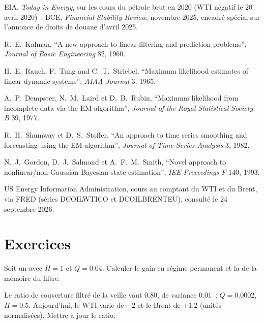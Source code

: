 \begin{omsources}
\item EIA, \emph{Today in Energy}, sur les cours du pétrole brut en 2020 (WTI négatif le 20 avril 2020)~; BCE, \emph{Financial Stability Review}, novembre 2025, encadré spécial sur l'annonce de droits de douane d'avril 2025.
\item R.~E.~Kalman, ``A new approach to linear filtering and prediction problems'', \emph{Journal of Basic Engineering} 82, 1960.
\item H.~E.~Rauch, F.~Tung and C.~T.~Striebel, ``Maximum likelihood estimates of linear dynamic systems'', \emph{AIAA Journal} 3, 1965.
\item A.~P.~Dempster, N.~M.~Laird et D.~B.~Rubin, ``Maximum likelihood from incomplete data via the EM algorithm'', \emph{Journal of the Royal
Statistical Society B} 39, 1977.
\item R.~H.~Shumway et D.~S.~Stoffer, ``An approach to time series smoothing and forecasting using the EM algorithm'', \emph{Journal of Time Series
Analysis} 3, 1982.
\item N.~J.~Gordon, D.~J.~Salmond et A.~F.~M.~Smith, ``Novel approach to nonlinear/non-Gaussian Bayesian state estimation'', \emph{IEE Proceedings F} 140,
1993.
\item US Energy Information Administration, cours au comptant du WTI et du Brent, via FRED (séries DCOILWTICO et DCOILBRENTEU), consulté le 24 septembre 2026.
\end{omsources}

\section{Exercices}

\begin{exercise}[$\star$]\label{exo:qm:state-space-models-and-the-kalman-filter:1}
Soit un  avec $H = 1$ et $Q = 0.04$. Calculer le gain en régime permanent et la  de la mémoire du filtre.
\end{exercise}

\begin{exercise}[$\star$]\label{exo:qm:state-space-models-and-the-kalman-filter:2}
Le ratio de couverture filtré de la veille vaut $0.80$, de variance $0.01$~; $Q = 0.0002$, $H = 0.5$. Aujourd'hui, le WTI varie de $+2$ et le Brent de $+1.2$ (unités normalisées). Mettre à jour le ratio.
\end{exercise}

